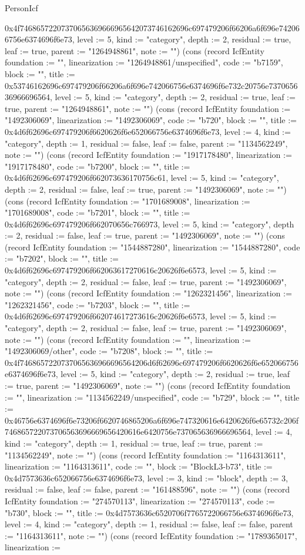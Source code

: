 \begin{lexlean}{PersonIcf}
\begin{semanticmodule}
{0x4f74686572207370656369666965642073746162696c697479206f66206a6f696e742066756e6374696f6e73, level := 5, kind := "category", depth := 2, residual := true, leaf := true, parent := "1264948861", note := ""}) (cons (record IcfEntity {foundation := "", linearization := "1264948861/unspecified", code := "b7159", block := "", title := 0x53746162696c697479206f66206a6f696e742066756e6374696f6e732c20756e737065636966696564, level := 5, kind := "category", depth := 2, residual := true, leaf := true, parent := "1264948861", note := ""}) (cons (record IcfEntity {foundation := "1492306069", linearization := "1492306069", code := "b720", block := "", title := 0x4d6f62696c697479206f6620626f6e652066756e6374696f6e73, level := 4, kind := "category", depth := 1, residual := false, leaf := false, parent := "1134562249", note := ""}) (cons (record IcfEntity {foundation := "1917178480", linearization := "1917178480", code := "b7200", block := "", title := 0x4d6f62696c697479206f662073636170756c61, level := 5, kind := "category", depth := 2, residual := false, leaf := true, parent := "1492306069", note := ""}) (cons (record IcfEntity {foundation := "1701689008", linearization := "1701689008", code := "b7201", block := "", title := 0x4d6f62696c697479206f662070656c766973, level := 5, kind := "category", depth := 2, residual := false, leaf := true, parent := "1492306069", note := ""}) (cons (record IcfEntity {foundation := "1544887280", linearization := "1544887280", code := "b7202", block := "", title := 0x4d6f62696c697479206f662063617270616c20626f6e6573, level := 5, kind := "category", depth := 2, residual := false, leaf := true, parent := "1492306069", note := ""}) (cons (record IcfEntity {foundation := "1262321456", linearization := "1262321456", code := "b7203", block := "", title := 0x4d6f62696c697479206f662074617273616c20626f6e6573, level := 5, kind := "category", depth := 2, residual := false, leaf := true, parent := "1492306069", note := ""}) (cons (record IcfEntity {foundation := "", linearization := "1492306069/other", code := "b7208", block := "", title := 0x4f7468657220737065636966696564206d6f62696c697479206f6620626f6e652066756e6374696f6e73, level := 5, kind := "category", depth := 2, residual := true, leaf := true, parent := "1492306069", note := ""}) (cons (record IcfEntity {foundation := "", linearization := "1134562249/unspecified", code := "b729", block := "", title := 0x46756e6374696f6e73206f6620746865206a6f696e747320616e6420626f6e65732c206f746865722073706563696669656420616e6420756e737065636966696564, level := 4, kind := "category", depth := 1, residual := true, leaf := true, parent := "1134562249", note := ""}) (cons (record IcfEntity {foundation := "1164313611", linearization := "1164313611", code := "", block := "BlockL3-b73", title := 0x4d7573636c652066756e6374696f6e73, level := 3, kind := "block", depth := 3, residual := false, leaf := false, parent := "161488596", note := ""}) (cons (record IcfEntity {foundation := "274570113", linearization := "274570113", code := "b730", block := "", title := 0x4d7573636c6520706f7765722066756e6374696f6e73, level := 4, kind := "category", depth := 1, residual := false, leaf := false, parent := "1164313611", note := ""}) (cons (record IcfEntity {foundation := "1789365017", linearization := }
\end{semanticmodule}
\end{lexlean}
